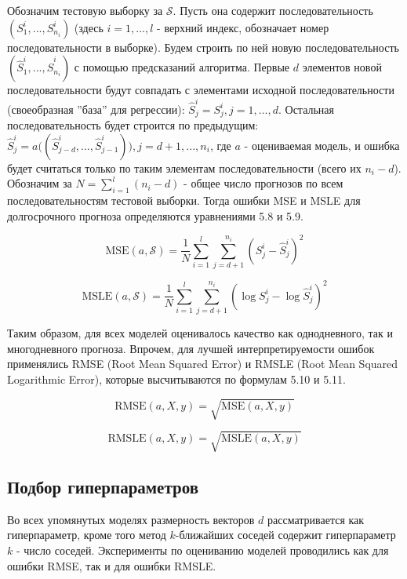 \documentclass[a4paper, 12pt]{article}
\begin{document}
Обозначим тестовую выборку за $\mathcal{S}$. Пусть она содержит последовательность $(S^i_1, ..., S^i_{n_i})$ (здесь $i = 1, ..., l$ - верхний индекс, обозначает номер последовательности в выборке). Будем строить по ней новую последовательность $(\widehat{S}^i_1, ..., \widehat{S}^i_{n_i})$ с помощью предсказаний алгоритма. Первые $d$ элементов новой последовательности будут совпадать с элементами исходной последовательности (своеобразная ''база'' для регрессии): $\widehat{S}^i_j = S^i_j, j = 1, ..., d$. Остальная последовательность будет строится по предыдущим: $\widehat{S}^i_j = a\big((\widehat{S}^i_{j-d}, ..., \widehat{S}^i_{j-1})\big), j = d + 1, ..., n_i$, где $a$ - оцениваемая модель, и ошибка будет считаться только по таким элементам последовательности (всего их $n_i - d$). Обозначим за $N = \sum_{i=1}^l (n_i - d)$ - общее число прогнозов по всем последовательностям тестовой выборки. Тогда ошибки MSE и MSLE для долгосрочного прогноза определяются уравнениями 5.8 и 5.9.

\begin{equation}
    \text{MSE}(a, \mathcal{S}) = \frac{1}{N} \sum_{i=1}^l \sum_{j=d+1}^{n_i} (S^i_j - \widehat{S}^i_j)^2
\end{equation}

\begin{equation}
    \text{MSLE}(a, \mathcal{S}) = \frac{1}{N} \sum_{i=1}^l \sum_{j=d+1}^{n_i} (\log S^i_j - \log \widehat{S}^i_j)^2
\end{equation}

Таким образом, для всех моделей оценивалось качество как однодневного, так и многодневного прогноза. Впрочем, для лучшей интерпретируемости ошибок применялись RMSE (Root Mean Squared Error) и RMSLE (Root Mean Squared Logarithmic Error), которые высчитываются по формулам 5.10 и 5.11.

\begin{equation}
    \text{RMSE}(a, X, y) = \sqrt{\text{MSE}(a, X, y)}
\end{equation}

\begin{equation}
    \text{RMSLE}(a, X, y) = \sqrt{\text{MSLE}(a, X, y)}
\end{equation}

\subsection{Подбор гиперпараметров}

Во всех упомянутых моделях размерность векторов $d$ рассматривается как гиперпараметр, кроме того метод $k$-ближайших соседей содержит гиперпараметр $k$ - число соседей. Эксперименты по оцениванию моделей проводились как для ошибки RMSE, так и для ошибки RMSLE.
\end{document}
